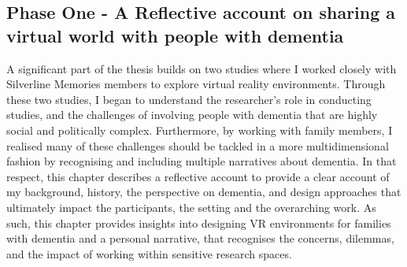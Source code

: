 \begin{table}[htp]
\centering
\caption{Overview of collected data}
\label{tab:OverviewDataCollection}
\end{table}

\subsection{Phase One - A Reflective account on sharing a virtual world with people with dementia}

A significant part of the thesis builds on two studies where I worked closely with Silverline Memories members to explore virtual reality environments. Through these two studies, I began to understand the researcher's role in conducting studies, and the challenges of involving people with dementia that are highly social and politically complex. Furthermore, by working with family members, I realised many of these challenges should be tackled in a more multidimensional fashion by recognising and including multiple narratives about dementia. In that respect, this chapter describes a reflective account to provide a clear account of my background, history, the perspective on dementia, and design approaches that ultimately impact the participants, the setting and the overarching work. As such, this chapter provides insights into designing VR environments for families with dementia and a personal narrative, that recognises the concerns, dilemmas, and the impact of working within sensitive research spaces. 

